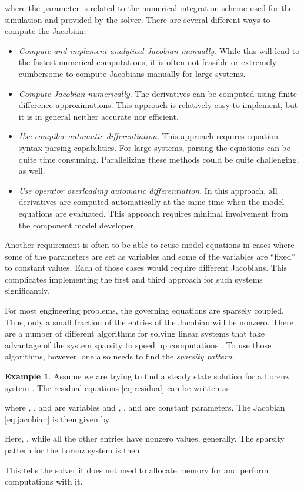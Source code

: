 \documentclass[10pt]{ijnam}
\theoremstyle{definition}
\newtheorem{example}{Example}[section]
\newcommand\xqed[1]{\leavevmode\unskip\penalty9999 \hbox{}\nobreak\hfill \quad\hbox{#1}}
\newcommand{\exampleSymbol}{\xqed{}}
\begin{document}
where the parameter  is related to the numerical integration scheme used for the simulation and provided by the solver. There are several different ways to compute the Jacobian:
\begin{itemize}[leftmargin=1em]
\item \textit{Compute and implement analytical Jacobian manually}. While this will lead to the fastest numerical computations, it is often not feasible or extremely cumbersome to compute Jacobians manually for large systems.
\item \textit{Compute Jacobian numerically}. The derivatives can be computed using finite difference approximations. This approach is relatively easy to implement, but it is in general neither accurate nor efficient.
\item \textit{Use compiler automatic differentiation}. This approach requires equation syntax parsing capabilities. For large systems, parsing the equations can be quite time consuming. Parallelizing these methods could be quite challenging, as well.
\item \textit{Use operator overloading automatic differentiation}. In this approach, all derivatives are computed automatically at the same time when the model equations are evaluated. This approach requires minimal involvement from the component model developer.
\end{itemize}
Another requirement is often to be able to reuse model equations in cases where some of the parameters  are set as variables and some of the variables  are ``fixed''  to constant values. Each of those cases would require different Jacobians. This complicates implementing the first and third approach for such systems significantly.

For most engineering problems, the governing equations are sparsely coupled. Thus, only a small fraction of the entries of the Jacobian will be nonzero. There are a number of different algorithms for solving linear systems that take advantage of the system sparsity to speed up computations \cite{li05,davis2010}. To use those algorithms, however, one also needs to find the \textit{sparsity pattern}.

\begin{example} \label{ex:Lorenz}
Assume we are trying to find a steady state solution for a Lorenz system \cite{lorenz1963}. The residual equations \eqref{eq:residual} can be written as

where , , and  are variables and , , and  are constant parameters. The Jacobian \eqref{eq:jacobian} is then given by

Here, , while all the other entries have nonzero values, generally. The sparsity pattern for the Lorenz system is then

This tells the solver it does not need to allocate memory for  and perform computations with it. \exampleSymbol
\end{example}
\end{document}
